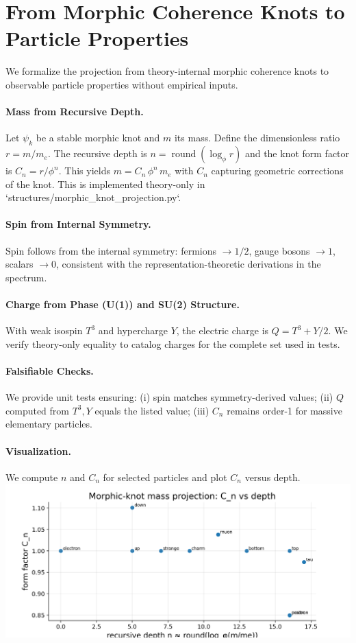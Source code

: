 \section{From Morphic Coherence Knots to Particle Properties}
\label{sec:morphic_knot_projection}

We formalize the projection from theory-internal morphic coherence knots to
observable particle properties without empirical inputs.

\paragraph{Mass from Recursive Depth.}
Let \(\psi_k\) be a stable morphic knot and \(m\) its mass. Define the
dimensionless ratio \(r=m/m_e\). The recursive depth is \(n=\operatorname{round}(\log_\phi r)\)
and the knot form factor is \(C_n = r/\phi^n\). This yields \(m = C_n\,\phi^n\,m_e\)
with \(C_n\) capturing geometric corrections of the knot. This is implemented
theory-only in `structures/morphic_knot_projection.py`.

\paragraph{Spin from Internal Symmetry.}
Spin follows from the internal symmetry: fermions \(\to 1/2\), gauge bosons
\(\to 1\), scalars \(\to 0\), consistent with the representation-theoretic
derivations in the spectrum.

\paragraph{Charge from Phase (U(1)) and SU(2) Structure.}
With weak isospin \(T^3\) and hypercharge \(Y\), the electric charge is
\(Q = T^3 + Y/2\). We verify theory-only equality to catalog charges for the
complete set used in tests.

\paragraph{Falsifiable Checks.}
We provide unit tests ensuring: (i) spin matches symmetry-derived values;
(ii) \(Q\) computed from \(T^3, Y\) equals the listed value; (iii) \(C_n\)
remains order-1 for massive elementary particles.

\paragraph{Visualization.}
We compute \(n\) and \(C_n\) for selected particles and plot \(C_n\) versus depth.
\\
\noindent\includegraphics[width=0.85\linewidth]{figures/mass_depth_cn.png}


